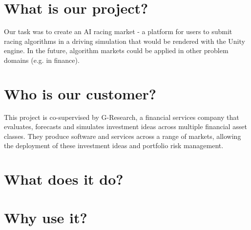 \project 
\section{What is our project?}
Our task was to create an AI racing market - a platform for users to submit racing algorithms in a driving simulation that would be rendered with the Unity engine. In the future, algorithm markets could be applied in other problem domains (e.g. in finance).

\section{Who is our customer?}
This project is co-supervised by G-Research, a financial services company that evaluates, forecasts and simulates investment ideas across multiple financial asset classes. They produce software and services across a range of markets, allowing the deployment of these investment ideas and portfolio risk management.

\section{What does it do?}
\section{Why use it?}
